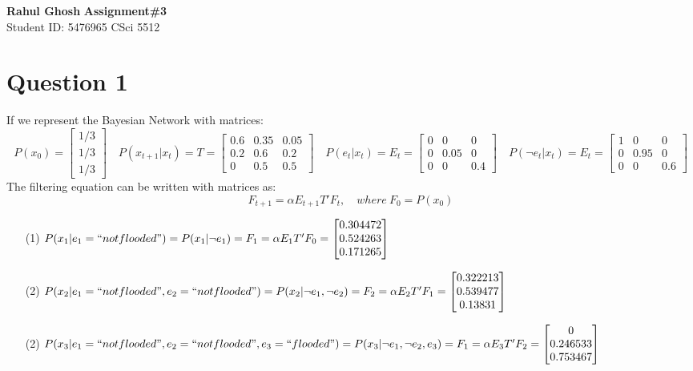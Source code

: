 \documentclass[letter, 9pt]{article}
\begin{document}
\noindent
\large \textbf{Rahul Ghosh} \hfill \textbf{Assignment\#3}\\
\normalsize Student ID: 5476965 \hfill CSci 5512\\

\section*{Question 1}
If we represent the Bayesian Network with matrices:
\begin{equation*}
    P(x_0) = 
    \begin{bmatrix}
        1/3\\
        1/3\\
        1/3
    \end{bmatrix}
    \quad
    P(x_{t+1}|x_t) = T =
    \begin{bmatrix}
        0.6 & 0.35 & 0.05 \\
        0.2 & 0.6 & 0.2 \\
        0 & 0.5 & 0.5
    \end{bmatrix}
    \quad
    P(e_t|x_t) = E_t =
    \begin{bmatrix}
        0 & 0 & 0 \\
        0 & 0.05 & 0 \\
        0 & 0 & 0.4
    \end{bmatrix}
    \quad
    P(\neg e_t|x_t) = E_t =
    \begin{bmatrix}
        1 & 0 & 0 \\
        0 & 0.95 & 0 \\
        0 & 0 & 0.6
    \end{bmatrix}
\end{equation*}
The filtering equation can be written with matrices as:
\begin{equation*}
    F_{t+1} = \alpha E_{t+1}T'F_t, \quad where\ F_0 = P(x_0)
\end{equation*}
\begin{itemize}
    \item[(1)] $P(x_1|e_1=``not flooded") = P(x_1| \neg e_1) = F_1 = \alpha E_1T'F_0 = 
    \begin{bmatrix}
        0.304472\\
        0.524263\\
        0.171265
    \end{bmatrix}$
    \item[(2)] $P(x_2|e_1=``not flooded", e_2=``not flooded") = P(x_2|\neg e_1, \neg e_2) = F_2 = \alpha E_2T'F_1 = 
    \begin{bmatrix}
        0.322213\\
        0.539477\\
        0.13831
    \end{bmatrix}$
    \item[(2)] $P(x_3|e_1=``not flooded", e_2=``not flooded", e_3=``flooded") = P(x_3| \neg e_1, \neg e_2, e_3) = F_1 = \alpha E_3T'F_2 = 
    \begin{bmatrix}
        0\\
        0.246533\\
        0.753467
    \end{bmatrix}$
\end{itemize}
\end{document}
